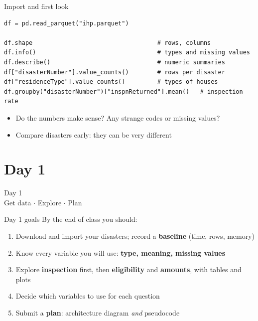 \documentclass[aspectratio=43,11pt]{beamer}
\begin{document}
\begin{frame}[fragile]{Import and first look}
\begin{lstlisting}
df = pd.read_parquet("ihp.parquet")

df.shape                                   # rows, columns
df.info()                                  # types and missing values
df.describe()                              # numeric summaries
df["disasterNumber"].value_counts()        # rows per disaster
df["residenceType"].value_counts()         # types of houses
df.groupby("disasterNumber")["inspnReturned"].mean()   # inspection rate
\end{lstlisting}
  \vspace{0.5em}
  \begin{itemize}
    \item Do the numbers make sense? Any strange codes or missing values?
    \item Compare disasters early: they can be very different
  \end{itemize}
\end{frame}

\section{Day 1}

\begin{frame}
  \centering
  \Huge Day 1 \\[0.5em]
  \large Get data $\cdot$ Explore $\cdot$ Plan
\end{frame}

\begin{frame}{Day 1 goals}
  By the end of class you should:
  \vspace{0.5em}
  \begin{enumerate}
    \item Download and import your disasters; record a \textbf{baseline}
          (time, rows, memory)
    \item Know every variable you will use: \textbf{type, meaning, missing values}
    \item Explore \textbf{inspection} first, then \textbf{eligibility} and
          \textbf{amounts}, with tables and plots
    \item Decide which variables to use for each question
    \item Submit a \textbf{plan}: architecture diagram \emph{and} pseudocode
  \end{enumerate}
\end{frame}
\end{document}
